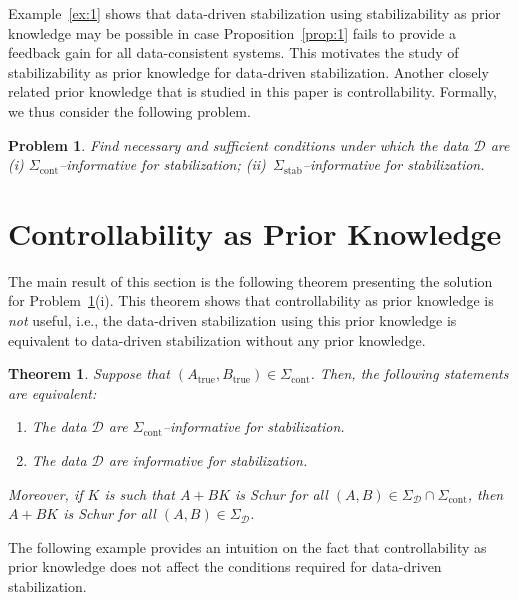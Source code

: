 \documentclass[9pt,shortpaper,twoside,web]{ieeecolor}
\newtheorem{theorem}{Theorem}
\newtheorem{problem}{Problem}
\begin{document}
Example~\ref{ex:1} shows that data-driven stabilization using stabilizability as prior knowledge may be possible in case Proposition~\ref{prop:1} fails to provide a feedback gain for all data-consistent systems. This motivates the study of stabilizability as prior knowledge for data-driven stabilization. Another closely related prior knowledge that is studied in this paper is controllability. Formally, we thus consider the following problem. 
\begin{problem}
\label{prob:1}
Find necessary and sufficient conditions under which the data $\mathcal{D}$ are (i) $\Sigma_\text{cont}$--informative for stabilization; \mbox{(ii) $\Sigma_\text{stab}$--informative} for stabilization.
\end{problem}



\section{Controllability as Prior Knowledge}

The main result of this section is the following theorem presenting the solution for Problem~\ref{prob:1}(i). This theorem shows that controllability as prior knowledge is \emph{not} useful, i.e., the data-driven stabilization using this prior knowledge is equivalent to data-driven stabilization without any prior knowledge. 

\begin{theorem}
\label{th:1}
Suppose that $(A_\text{true},B_\text{true})\in\Sigma_\text{cont}$. Then, the following statements are equivalent:
\begin{enumerate}[label=(\alph*),ref=\ref{th:1}(\alph*)]
    \item The data $\mathcal{D}$ are $\Sigma_\text{cont}$--informative for stabilization.
    \item The data $\mathcal{D}$ are informative for stabilization.
\end{enumerate}
Moreover, if $K$ is such that $A+BK$ is Schur for all \mbox{$(A,B)\in\Sigma_\mathcal{D}\cap\Sigma_\text{cont}$}, then $A+BK$ is Schur for all $(A,B)\in\Sigma_\mathcal{D}$. 
\end{theorem}


The following example provides an intuition on the fact that controllability as prior knowledge does not affect the conditions required for data-driven stabilization. 
\end{document}
